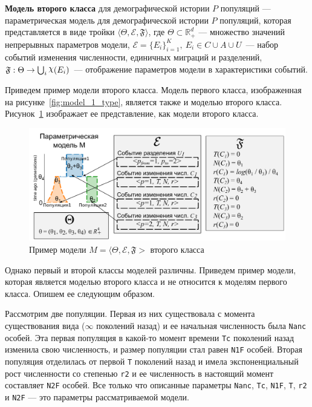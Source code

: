 \textbf{Модель второго класса} для демографической истории $P$ популяций --- параметрическая модель для демографической истории $P$ популяций, которая представляется в виде тройки $\langle\Theta, \mathcal{E}, \mathfrak{F}\rangle$, где $\Theta \subset \mathbb{R}_+^d$ --- множество значений непрерывных параметров модели, ${\mathcal{E} = \{E_i\}_{i=1}^K,\ E_i \in C \cup A \cup U}$~--- набор событий изменения численности, единичных миграций и разделений, ${\mathfrak{F}: \Theta \to \bigcup_i \rchi(E_i)}$~--- отображение параметров модели в характеристики событий.

Приведем пример модели второго класса.
Модель первого класса, изображенная на рисунке~\ref{fig:model_1_type}, является также и моделью второго класса.
Рисунок~\ref{fig:model_2_type} изображает ее представление, как модели второго класса.

\begin{figure}[ht]
    \centering
    \includegraphics[width=\textwidth]{images_2/model_2_type.pdf}
    \caption{Пример модели $M = \langle\Theta, \mathcal{E}, \mathfrak{F}>$ второго класса}
    \label{fig:model_2_type}
\end{figure}


Однако первый и второй классы моделей различны.
Приведем пример модели, которая является моделью второго класса и не относится к моделям первого класса.
Опишем ее следующим образом.

Рассмотрим две популяции.
Первая из них существовала с момента существования вида ($\infty$ поколений назад) и ее начальная численность была \texttt{Nanc} особей.
Эта первая популяция в какой-то момент времени \texttt{Tc} поколений назад изменила свою численность, и размер популяции стал равен \texttt{N1F} особей.
Вторая популяция отделилась от первой \texttt{T} поколений назад и имела экспоненциальный рост численности со степенью \texttt{r2} и ее численность в настоящий момент составляет \texttt{N2F} особей.
Все только что описанные параметры \texttt{Nanc}, \texttt{Tc}, \texttt{N1F}, \texttt{T}, \texttt{r2} и \texttt{N2F} --- это параметры рассматриваемой модели.

